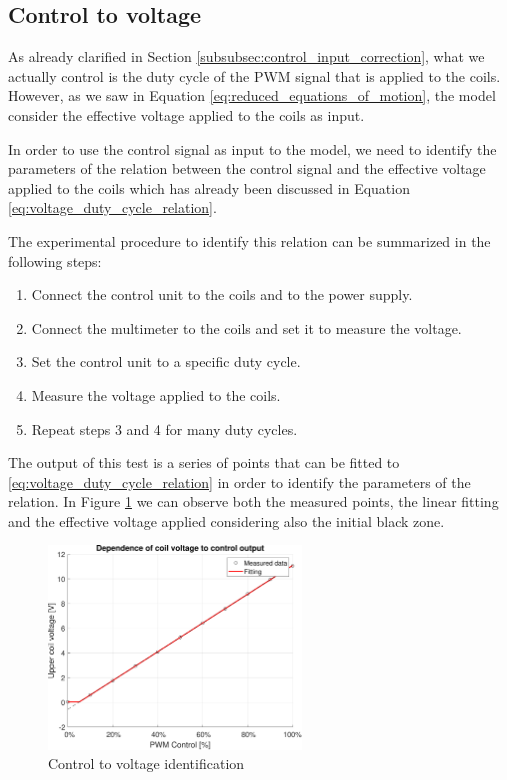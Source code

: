 \subsection{Control to voltage}
\label{subsec:control_to_voltage}

As already clarified in Section \ref{subsubsec:control_input_correction}, what we actually control is the duty cycle of the PWM signal that is applied to the coils.
However, as we saw in Equation \ref{eq:reduced_equations_of_motion}, the model consider the effective voltage applied to the coils as input.

In order to use the control signal as input to the model, we need to identify the parameters of the relation between the control signal and the effective voltage applied to the coils which has already been discussed in Equation \ref{eq:voltage_duty_cycle_relation}.

The experimental procedure to identify this relation can be summarized in the following steps:

\begin{enumerate}
    \item Connect the control unit to the coils and to the power supply.
    \item Connect the multimeter to the coils and set it to measure the voltage.
    \item Set the control unit to a specific duty cycle.
    \item Measure the voltage applied to the coils.
    \item Repeat steps 3 and 4 for many duty cycles.
\end{enumerate}

The output of this test is a series of points that can be fitted to \ref{eq:voltage_duty_cycle_relation} in order to identify the parameters of the relation.
In Figure \ref{fig:control_to_voltage} we can observe both the measured points, the linear fitting and the effective voltage applied considering also the initial black zone.

\begin{figure}[H]
    \centering
    \includegraphics[width=0.6\textwidth]{img/MATLAB/identification/control_to_voltage.pdf}
    \caption{Control to voltage identification}
    \label{fig:control_to_voltage}
\end{figure}

